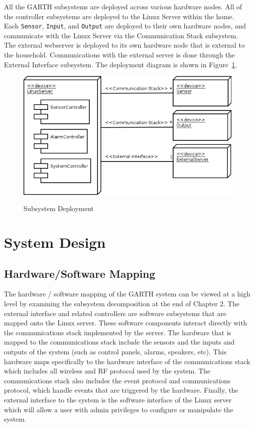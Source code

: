 \documentclass{report}
\begin{document}
All the GARTH subsystems are deployed across various hardware
nodes. All of the controller subsystems are deployed to the Linux
Server within the home. Each \texttt{Sensor}, \texttt{Input}, and
\texttt{Output} are deployed to their own hardware nodes, and
communicate with the Linux Server via the Communication Stack
subsystem. The external webserver is deployed to its own hardware node
that is external to the household. Communications with the external
server is done through the External Interface subsystem. The
deployment diagram is shown in Figure~\ref{fig:subsystem_deployment}.

\begin{figure}[hp]
  \centering
  \caption{Subsystem Deployment}
  \includegraphics[scale=0.5]{deployment.png}
  \label{fig:subsystem_deployment}
\end{figure}

\chapter{System Design} %
\label{ch:system-design}

\section{Hardware/Software Mapping}

The hardware / software mapping of the GARTH system can be viewed at a high
level by examining the subsystem decomposition at the end of Chapter 2. The
external interface and related controllers are software subsystems that are
mapped onto the Linux server. These software components interact directly with
the communications stack implemented by the server. The hardware that is mapped
to the communications stack include the sensors and the inputs and outputs of
the system (such as control panels, alarms, speakers, etc). This hardware maps
specifically to the hardware interface of the communications stack which
includes all wireless and RF protocol used by the system. The communications
stack also includes the event protocol and communications protocol, which
handle events that are triggered by the hardware. Finally, the external interface
to the system is the software interface of the Linux server which will allow a
user with admin privileges to configure or manipulate the system.
\end{document}
